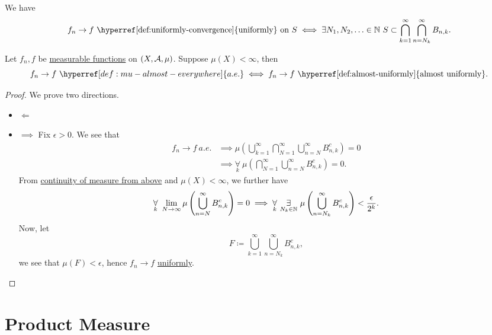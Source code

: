 \begin{lemma}
	We have
	\[
		f_{n}\to f \text{ \hyperref[def:uniformly-convergence]{uniformly} on } S \iff \exists N_1, N_2, \ldots\in \mathbb{\MakeUppercase{n}}\ S\subset \bigcap\limits_{k=1}^{\infty} \bigcap\limits_{n=N_k}^{\infty} B_{n, k}.
	\]
\end{lemma}

\begin{theorem}\label{thm:Egorov-theorem}
	Let \(f_{n}, f\) be \hyperref[def:measurable-function]{measurable functions} on \((X, \mathcal{\MakeUppercase{a}} , \mu )\). Suppose \(\mu (X)<\infty \), then
	\[
		f_{n}\to f\ \hyperref[def:mu-almost-everywhere]{a.e.} \iff f_{n}\to f\text{ \hyperref[def:almost-uniformly]{almost uniformly}}.
	\]
\end{theorem}
\begin{proof}
	We prove two directions.
	\begin{itemize}
		\item \(\Longleftarrow \) 
		\item \(\implies \) Fix \(\epsilon > 0\). We see that
		      \[
			      \begin{split}
				      f_{n}\to f\ \hyperref[def:mu-almost-everywhere]{a.e.} &\implies \mu \left(\bigcup\limits_{k=1}^{\infty} \bigcap\limits_{N=1}^{\infty} \bigcup\limits_{n=N}^{\infty} B_{n, k}^{c} \right) = 0 \\
				      &\implies \underset{k}{\forall}\ \mu \left(\bigcap\limits_{N=1}^{\infty} \bigcup\limits_{n=N}^{\infty} B_{n, k}^{c} \right) = 0.
			      \end{split}
		      \]
		      From \hyperref[thm:measure-space-continuity-from-above]{continuity of measure from above} and \(\mu (X)<\infty \), we further have
		      \[
			      \underset{k}{\forall}\ \lim\limits_{N \to \infty} \mu \left(\bigcup\limits_{n=N}^{\infty} B_{n, k}^{c} \right) = 0 \implies \underset{k}{\forall}\ \underset{ N_{k}\in\mathbb{\MakeUppercase{n}}}{\exists}\ \mu \left(\bigcup\limits_{n=N_{k}}^{\infty} B_{n, k}^{c} \right)< \frac{\epsilon}{2^k}.
		      \]
		      Now, let
		      \[
			      F \coloneqq \bigcup\limits_{k=1}^{\infty} \bigcup\limits_{n=N_{k}}^{\infty} B_{n, k}^{c} ,
		      \]
		      we see that \(\mu (F) < \epsilon \), hence \(f_{n}\to f\) \hyperref[def:uniformly-convergence]{uniformly}.
	\end{itemize}
\end{proof}

\section{Product Measure}
